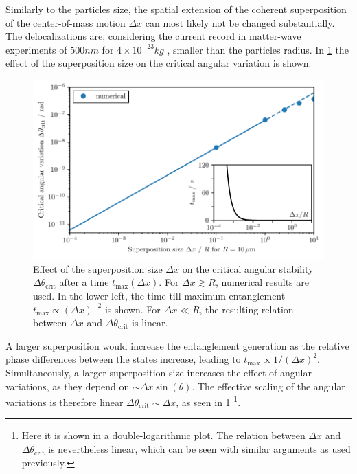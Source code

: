 Similarly to the particles size, the spatial extension of the coherent superposition of the center-of-mass motion $\Delta x$ can most likely not be changed substantially. The delocalizations are, considering the current record in matter-wave experiments of $500\si{nm}$ for $4\times 10^{-23}\si{kg}$ \cite{Fein_2019}, smaller than the particles radius. 
In \cref{fig:4:theta-crit-superposition-size} the effect of the superposition size on the critical angular variation is shown.
\begin{figure}[!htbp]
  \centering
  \includegraphics[width=\textwidth]{./../figures/theta-variance/theta-crit-superpos-size.pdf}
  \caption{Effect of the superposition size $\Delta x$ on the critical angular stability $\Delta \theta_\mathrm{crit}$ after a time $t_\mathrm{max}(\Delta x)$. For $\Delta x \gtrsim R$, numerical results are used. In the lower left, the time till maximum entanglement $t_\mathrm{max} \propto (\Delta x)^{-2}$ is shown. For $\Delta x \ll R$, the resulting relation between $\Delta x$ and $\Delta \theta_\mathrm{crit}$ is linear.}
  \label{fig:4:theta-crit-superposition-size}
\end{figure}
A larger superposition would increase the entanglement generation as the relative phase differences between the states increase, leading to $t_\mathrm{max} \propto 1/(\Delta x)^{2}$. 
Simultaneously, a larger superposition size increases the effect of angular variations, as they depend on $\sim \Delta x \sin(\theta)$.
The effective scaling of the angular variations is therefore linear $\Delta \theta_\mathrm{crit} \sim \Delta x$, as seen in \cref{fig:4:theta-crit-superposition-size} \footnote{Here it is shown in a double-logarithmic plot. The relation between $\Delta x$ and $\Delta \theta_\mathrm{crit}$ is nevertheless linear, which can be seen with similar arguments as used previously.}.




